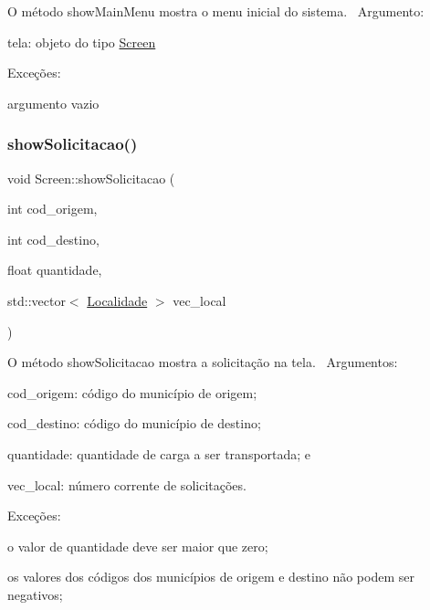 O método show\+Main\+Menu mostra o menu inicial do sistema.~\newline
Argumento\+:
\begin{DoxyItemize}
\item tela\+: objeto do tipo \hyperlink{classScreen}{Screen}
\end{DoxyItemize}

Exceções\+:
\begin{DoxyItemize}
\item argumento vazio
\end{DoxyItemize}\mbox{\label{classScreen_a2f514fb5d139b0b6e8d67c95ee6a2596}} 
\subsubsection{\texorpdfstring{show\+Solicitacao()}{showSolicitacao()}}
{\footnotesize\ttfamily void Screen\+::show\+Solicitacao (\begin{DoxyParamCaption}\item[{int}]{cod\+\_\+origem,  }\item[{int}]{cod\+\_\+destino,  }\item[{float}]{quantidade,  }\item[{std\+::vector$<$ \hyperlink{classLocalidade}{Localidade} $>$}]{vec\+\_\+local }\end{DoxyParamCaption})}

O método show\+Solicitacao mostra a solicitação na tela.~\newline
Argumentos\+:
\begin{DoxyItemize}
\item cod\+\_\+origem\+: código do município de origem;
\item cod\+\_\+destino\+: código do município de destino;
\item quantidade\+: quantidade de carga a ser transportada; e
\item vec\+\_\+local\+: número corrente de solicitações.
\end{DoxyItemize}

Exceções\+:
\begin{DoxyItemize}
\item o valor de quantidade deve ser maior que zero;
\item os valores dos códigos dos municípios de origem e destino não podem ser negativos;
\end{DoxyItemize}\mbox{\label{classScreen_ac974e1d0dc9ab1f4c9be2d8f70d763c7}} 
